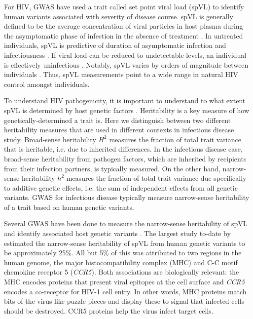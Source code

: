 \documentclass[]{article}
\begin{document}
\begin{doublespace}
For HIV, GWAS have used a trait called set point viral load (spVL) to identify human variants associated with severity of disease course. spVL is generally defined to be the average concentration of viral particles in host plasma during the asymptomatic phase of infection in the absence of treatment \citep{Mellors1996}. In untreated individuals, spVL is predictive of duration of asymptomatic infection \citep{Mellors1996} and infectiousness \citep{Quinn2000}. If viral load can be reduced to undetectable levels, an individual is effectively uninfectious \citep{HHSARTGuidelines2019}. Notably, spVL varies by orders of magnitude between individuals \citep{Mellors1996}. Thus, spVL measurements point to a wide range in natural HIV control amongst individuals. 

To understand HIV pathogenicity, it is important to understand to what extent spVL is determined by host genetic factors \citep{Bartha2013, Dalmasso2008, Fellay2007, Pereyra2010, Fellay2009, Pelak2010, VanManen2011, McLaren2012}. Heritability is a key measure of how genetically-determined a trait is. Here we distinguish between two different heritability measures that are used in different contexts in infectious disease study. Broad-sense heritability $H^2$ measures the fraction of total trait variance that is heritable, i.e. due to inherited differences. In the infectious disease case, broad-sense heritability from pathogen factors, which are inherited by recipients from their infection partners, is typically measured. On the other hand, narrow-sense heritability $h^2$ measures the fraction of total trait variance due specifically to additive genetic effects, i.e. the sum of independent effects from all genetic variants. GWAS for infectious disease typically measure narrow-sense heritability of a trait based on human genetic variants.

Several GWAS have been done to measure the narrow-sense heritability of spVL and identify associated host genetic variants \citep{Bartha2013, Dalmasso2008, Fellay2007, Pereyra2010, Fellay2009, Pelak2010, VanManen2011, McLaren2012}. The largest study to-date by \citet{McLaren2015} estimated the narrow-sense heritability of spVL from human genetic variants to be approximately 25\%. All but 5\% of this was attributed to two regions in the human genome, the major histocompatibility complex (MHC) and C-C motif chemokine receptor 5 (\emph{CCR5}). Both associations are biologically relevant: the MHC encodes proteins that present viral epitopes at the cell surface and \emph{CCR5} encodes a co-receptor for HIV-1 cell entry. In other words, MHC proteins match bits of the virus like puzzle pieces and display these to signal that infected cells should be destroyed. CCR5 proteins help the virus infect target cells.


\end{doublespace}
\end{document}

